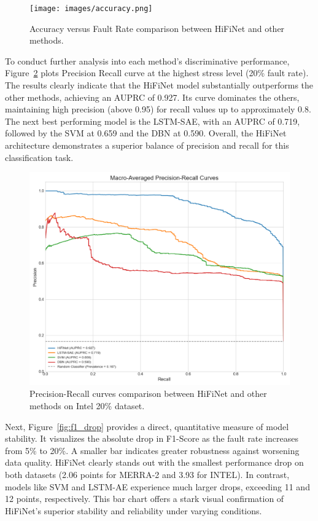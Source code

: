 \begin{figure}
  \centering
  \texttt{[image: images/accuracy.png]}
  \caption{Accuracy versus Fault Rate comparison between HiFiNet and other methods.}
  \label{fig:accuracy}
\end{figure}

To conduct further analysis into each method's discriminative performance, Figure~\ref{fig:pr_curve} plots Precision Recall curve at the highest stress level (20\% fault rate). The results clearly indicate that the HiFiNet model substantially outperforms the other methods, achieving an AUPRC of 0.927. Its curve dominates the others, maintaining high precision (above 0.95) for recall values up to approximately 0.8. The next best performing model is the LSTM-SAE, with an AUPRC of 0.719, followed by the SVM at 0.659 and the DBN at 0.590. Overall, the HiFiNet architecture demonstrates a superior balance of precision and recall for this classification task.

\begin{figure}
  \centering
  \includegraphics[width=\linewidth]{images/pr_curve.png}
  \caption{Precision-Recall curves comparison between HiFiNet and other methods on Intel 20\% dataset.}
  \label{fig:pr_curve}
\end{figure}

Next, Figure~\ref{fig:f1_drop} provides a direct, quantitative measure of model stability. It visualizes the absolute drop in F1-Score as the fault rate increases from 5\% to 20\%. A smaller bar indicates greater robustness against worsening data quality. HiFiNet clearly stands out with the smallest performance drop on both datasets (2.06 points for MERRA-2 and 3.93 for INTEL). In contrast, models like SVM and LSTM-AE experience much larger drops, exceeding 11 and 12 points, respectively. This bar chart offers a stark visual confirmation of HiFiNet's superior stability and reliability under varying conditions.

